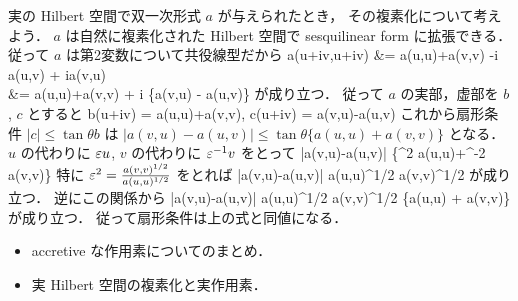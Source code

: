 実の Hilbert 空間で双一次形式 $a$ が与えられたとき，
その複素化について考えよう．
$a$ は自然に複素化された Hilbert 空間で sesquilinear form に拡張できる．
従って $a$ は第2変数について共役線型だから
\bdm %
a(u+iv,u+iv)
&= a(u,u)+a(v,v) -i a(u,v) + ia(v,u) \\
&= a(u,u)+a(v,v) + i \{a(v,u) - a(u,v)\}
\edm %
が成り立つ．
従って $a$ の実部，虚部を $b$, $c$ とすると
\bdm %
b(u+iv) = a(u,u)+a(v,v), \quad
c(u+iv) = a(v,u)-a(u,v)
\edm %
これから扇形条件 $|c| \le \tan\theta b$ は
$|a(v,u)-a(u,v)| \le \tan\theta\{a(u,u)+a(v,v)\}$ となる．
$u$ の代わりに $\varepsilon u$, $v$ の代わりに $\varepsilon^{-1} v$ をとって
\bdm %
|a(v,u)-a(u,v)| \le \tan\theta\{\e^2 a(u,u)+\e^{-2} a(v,v)\}
\edm %
特に $\varepsilon^2= \frac{a(v,v)^{1/2}}{a(u,u)^{1/2}}$ をとれば
\bdn %
|a(v,u)-a(u,v)|  \tan\theta a(u,u)^{1/2} a(v,v)^{1/2}
\edn %
が成り立つ．
逆にこの関係から
\bdm %
|a(v,u)-a(u,v)|  \tan\theta a(u,u)^{1/2} a(v,v)^{1/2}
\le  \tan\theta \{a(u,u) + a(v,v)\}
\edm %
が成り立つ．
従って扇形条件は上の式と同値になる．

\begin{itemize}
\item accretive な作用素についてのまとめ．
\item 実 Hilbert 空間の複素化と実作用素．
\end{itemize}



